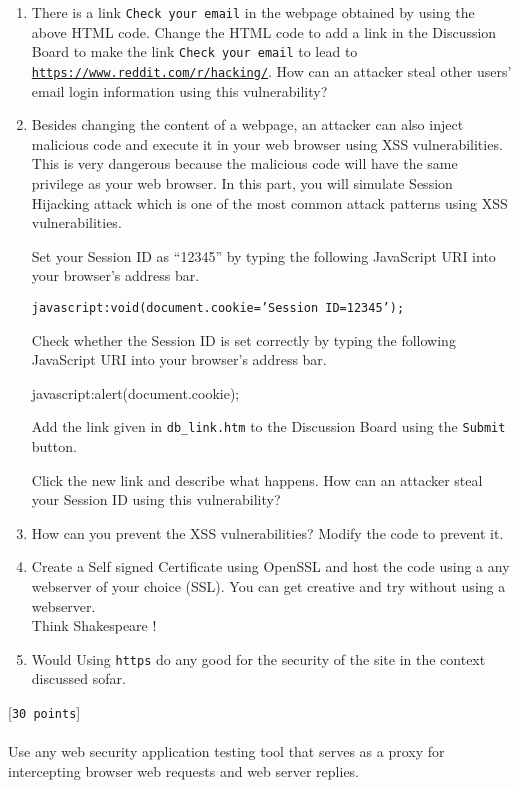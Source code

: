 \documentclass[11pt]{article}
\begin{document}
\begin{enumerate}
{}

\item {
There is a link \texttt{Check your email} in the webpage obtained by using the above HTML code.  Change the HTML code to add a link in the Discussion Board to make the link \texttt{Check your email} to lead to \href{https://www.reddit.com/r/hacking/}{\texttt{https://www.reddit.com/r/hacking/}}. How can an attacker steal other users’ email login information using this vulnerability?

}

\item {
Besides changing the content of a webpage, an attacker can also inject malicious code and execute it in your web browser using XSS vulnerabilities. This is very dangerous because the malicious code will have the same privilege as your web browser. In this part, you will simulate Session Hijacking attack which is one of the most common attack patterns using XSS vulnerabilities. 

Set your Session ID as “12345” by typing the following JavaScript URI into your browser’s address bar.

\texttt{javascript:void(document.cookie='Session ID=12345');}

Check whether the Session ID is set correctly by typing the following JavaScript URI into your browser’s address bar.

javascript:alert(document.cookie);

Add the link given in \texttt{db\_link.htm} to the Discussion Board using the \texttt{Submit} button.

Click the new link and describe what happens. 
How can an attacker steal your Session ID using this vulnerability?
}

\item {
How can you prevent the XSS vulnerabilities? Modify the code to prevent it.
}

\item {
Create a Self signed Certificate using OpenSSL and host the code using a any webserver of your choice (SSL). You can get creative and try without using a webserver. \\
Think Shakespeare !
}

\item {
Would Using \texttt{https} do any good for the security of the site in the context discussed sofar.
}
\end{enumerate}
\newpage
{} [\texttt{30 points}] \\\\
Use any web security application testing tool that serves as a proxy for intercepting browser web requests and web server replies.
\end{document}

